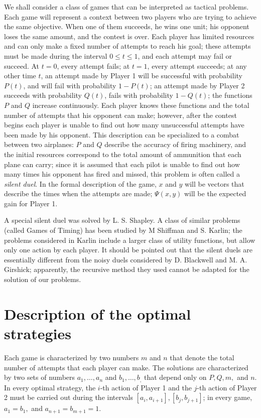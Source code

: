 \documentclass{article}
\begin{document}
We shall consider a class of games that can be interpreted as tactical
problems. Each game will represent a context between two players who are trying
to achieve the same objective. When one of them succeeds, he wins one unit; his
opponent loses the same amount, and the contest is over. Each player has
limited resources and can only make a fixed number of attempts to reach his
goal; these attempts must be made during the interval $0 \leq t \leq 1$, and
each attempt may fail or succeed. At $t=0$, every attempt fails; at $t=1$,
every attempt succeeds; at any other time $t$, an attempt made by Player 1 will
be successful with probability $P(t)$, and will fail with probability $1 -
P(t)$; an attempt made by Player 2 succeeds with probability $Q(t)$, fails with
probability $1- Q(t)$; the functions $P$ and $Q$ increase continuously. Each
player knows these functions and the total number of attempts that his opponent
can make; however, after the contest begins each player is unable to find out
how many unsuccessful attempts have been made by his opponent. This description
can be specialized to a combat between two airplanes: $P$ and $Q$ describe the
accuracy of firing machinery, and the initial resources correspond to the total
amount of ammunition that each plane can carry; since it is assumed that each
pilot is unable to find out how many times his opponent has fired and missed,
this problem is often called a \emph{silent duel}. In the formal description of
the game, $x$ and $y$ will be vectors that describe the times when the attempts
are made; $\Psi(x, y)$ will be the expected gain for Player 1.

A special silent duel was solved by L. S. Shapley. A class of similar problems
(called Games of Timing) has been studied by M Shiffman and S. Karlin; the
problems considered in Karlin include a larger class of utility functions, but
allow only one action by each player. It should be pointed out that the silent
duels are essentially different from the noisy duels considered by D. Blackwell
and M. A. Girshick; apparently, the recursive method they used cannot be
adapted for the solution of our problems.

\section{Description of the optimal strategies}

Each game is characterized by two numbers $m$ and $n$ that denote the total
number of attempts that each player can make. The solutions are characterized
by two sets of numbers $a_1, \dots, a_n$ and $b_1, \dots, b_,$ that depend only
on $P, Q, m,$ and $n$. In every optimal strategy, the $i$-th action of Player
1 and the $j$-th action of Player 2 must be carried out during the intervals
$[a_i, a_{i+1}], [b_j, b_{j+1}]$; in every game, $a_1 = b_1,$ and $a_{n+1} =
b_{m+1} = 1$.
\end{document}

